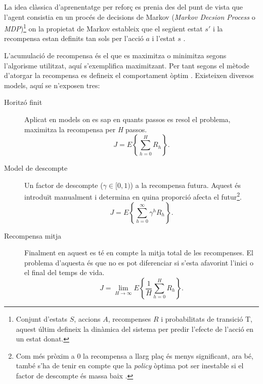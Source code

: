 \documentclass[12pt,a4paper,final,twoside]{article}
\begin{document}
La idea clàssica d'aprenentatge per reforç es prenia des del punt de vista que l'agent consistia en un procés de decisions de Markov (\textit{Markov Decsion Process} o \textit{MDP})\footnote{Conjunt d'estats $S$, accions $A$, recompenses $R$ i probabilitats de transició T, aquest últim defineix la dinàmica del sistema per predir l'efecte de l'acció en un estat donat.} on la propietat de Markov estableix que el següent estat $s'$ i la recompensa estan definits tan sols per l'acció $a$ i l'estat $s$ \cite{Sutton1998}. %


L'acumulació de recompensa és el que es maximitza o minimitza segons l'algorisme utilitzat, aquí s'exemplifica maximitzant. Per tant segons el mètode d'atorgar la recompensa es defineix el comportament òptim \cite{Kober2009}. Existeixen diversos models, aquí se n'exposen tres:
\begin{description}


\item[Horitzó finit] Aplicat en models on es sap en quants passos es resol el problema, maximitza la recompensa per \textit{H} passos.
\begin{equation}
J=E\left\{ \sum_{h=0}^{H} R_{h} \right\}.
\end{equation}

\item[Model de descompte] Un factor de descompte ($\gamma\in[0,1)$) a la recompensa futura. Aquest és introduït manualment i determina en quina proporció afecta el futur\footnote{Com més pròxim a 0 la recompensa a llarg plaç és menys significant, ara bé, també s'ha de tenir en compte que la \textit{policy} òptima pot ser inestable si el factor de descompte és massa baix \cite{Kober2009}.}.
\begin{equation}
J=E\left\{ \sum_{h=0}^{\infty} \gamma^h R_{h} \right\}.
\end{equation}

\item[Recompensa mitja] Finalment en aquest es té en compte la mitja total de les recompenses. El problema d'aquesta és que no es pot diferenciar si s'esta afavorint l'inici o el final del temps de vida.
\begin{equation}
J=\lim_{H \to \infty} E\left\{ \frac{1}{H}\sum_{h=0}^{H} R_{h} \right\}.
\end{equation} 

\end{description}
\end{document}
